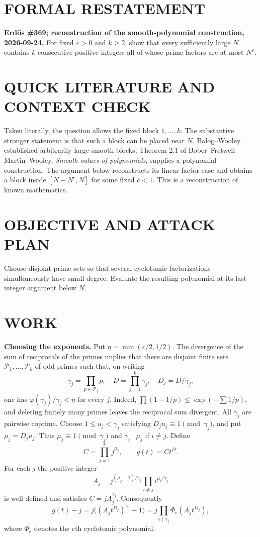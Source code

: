 \section{FORMAL RESTATEMENT}
\textbf{Erd\H{o}s \#369; reconstruction of the smooth-polynomial construction, 2026-09-24.}
For fixed $\varepsilon>0$ and $k\geq2$, show that every sufficiently large $N$ contains $k$ consecutive positive integers all of whose prime factors are at most $N^\varepsilon$.

\section{QUICK LITERATURE AND CONTEXT CHECK}
Taken literally, the question allows the fixed block $1,\ldots,k$. The substantive stronger statement is that such a block can be placed near $N$. Balog--Wooley established arbitrarily large smooth blocks; Theorem 2.1 of Bober--Fretwell--Martin--Wooley, \emph{Smooth values of polynomials}, supplies a polynomial construction. The argument below reconstructs its linear-factor case and obtains a block inside $[N-N^c,N]$ for some fixed $c<1$. This is a reconstruction of known mathematics.

\section{OBJECTIVE AND ATTACK PLAN}
Choose disjoint prime sets so that several cyclotomic factorizations simultaneously have small degree. Evaluate the resulting polynomial at its last integer argument below $N$.

\section{WORK}
\textbf{Choosing the exponents.} Put $\eta=\min(\varepsilon/2,1/2)$. The divergence of the sum of reciprocals of the primes implies that there are disjoint finite sets $\mathcal P_1,\ldots,\mathcal P_k$ of odd primes such that, on writing
\[
\gamma_j=\prod_{p\in\mathcal P_j}p,\quad
D=\prod_{j=1}^k\gamma_j,\quad D_j=D/\gamma_j,
\]
one has $\varphi(\gamma_j)/\gamma_j<\eta$ for every $j$. Indeed, $\prod(1-1/p)\leq\exp(-\sum1/p)$, and deleting finitely many primes leaves the reciprocal sum divergent. All $\gamma_j$ are pairwise coprime.
Choose $1\leq u_j<\gamma_j$ satisfying $D_j u_j\equiv1\pmod {\gamma_j}$, and put $\mu_j=D_j u_j$. Thus $\mu_j\equiv1\pmod {\gamma_j}$ and $\gamma_i\mid\mu_j$ if $i\ne j$. Define
\[
C=\prod_{j=1}^k j^{\mu_j},\qquad g(t)=Ct^D.
\]
For each $j$ the positive integer
\[
A_j=j^{(\mu_j-1)/\gamma_j}\prod_{i\ne j}i^{\mu_i/\gamma_j}
\]
is well defined and satisfies $C=jA_j^{\gamma_j}$. Consequently
\[
g(t)-j=j\big((A_jt^{D_j})^{\gamma_j}-1\big)
 =j\prod_{e\mid\gamma_j}\Phi_e(A_jt^{D_j}),                 \tag{1}
\]
where $\Phi_e$ denotes the $e$th cyclotomic polynomial.

